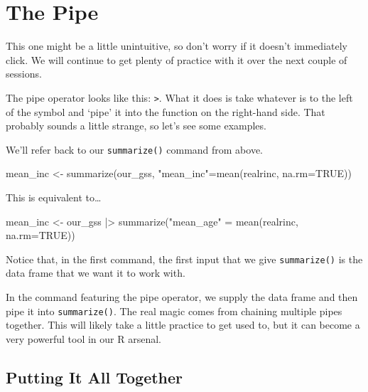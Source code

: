 \documentclass[
  letterpaper,
  DIV=11,
  numbers=noendperiod]{scrreprt}
\newenvironment{Shaded}{\begin{snugshade}}{\end{snugshade}}
\newcommand{\AttributeTok}[1]{\textcolor[rgb]{0.40,0.45,0.13}{#1}}
\newcommand{\ConstantTok}[1]{\textcolor[rgb]{0.56,0.35,0.01}{#1}}
\newcommand{\FunctionTok}[1]{\textcolor[rgb]{0.28,0.35,0.67}{#1}}
\newcommand{\NormalTok}[1]{\textcolor[rgb]{0.00,0.23,0.31}{#1}}
\newcommand{\OtherTok}[1]{\textcolor[rgb]{0.00,0.23,0.31}{#1}}
\newcommand{\SpecialCharTok}[1]{\textcolor[rgb]{0.37,0.37,0.37}{#1}}
\newcommand{\StringTok}[1]{\textcolor[rgb]{0.13,0.47,0.30}{#1}}
\begin{document}
\section{The Pipe}\label{the-pipe}

This one might be a little unintuitive, so don't worry if it doesn't
immediately click. We will continue to get plenty of practice with it
over the next couple of sessions.

The pipe operator looks like this: \texttt{\textbar{}\textgreater{}}.
What it does is take whatever is to the left of the symbol and `pipe' it
into the function on the right-hand side. That probably sounds a little
strange, so let's see some examples.

We'll refer back to our \texttt{summarize()} command from above.

\begin{Shaded}
\begin{Highlighting}[]
\NormalTok{mean\_inc }\OtherTok{\textless{}{-}} \FunctionTok{summarize}\NormalTok{(our\_gss, }\StringTok{"mean\_inc"}\OtherTok{=}\FunctionTok{mean}\NormalTok{(realrinc, }\AttributeTok{na.rm=}\ConstantTok{TRUE}\NormalTok{))}
\end{Highlighting}
\end{Shaded}

This is equivalent to\ldots{}

\begin{Shaded}
\begin{Highlighting}[]
\NormalTok{mean\_inc }\OtherTok{\textless{}{-}}\NormalTok{ our\_gss }\SpecialCharTok{|\textgreater{}}
  \FunctionTok{summarize}\NormalTok{(}\StringTok{"mean\_age"} \OtherTok{=} \FunctionTok{mean}\NormalTok{(realrinc, }\AttributeTok{na.rm=}\ConstantTok{TRUE}\NormalTok{))}
\end{Highlighting}
\end{Shaded}

Notice that, in the first command, the first input that we give
\texttt{summarize()} is the data frame that we want it to work with.

In the command featuring the pipe operator, we supply the data frame and
then pipe it into \texttt{summarize()}. The real magic comes from
chaining multiple pipes together. This will likely take a little
practice to get used to, but it can become a very powerful tool in our R
arsenal.

\subsection{Putting It All Together}\label{putting-it-all-together}
\end{document}
